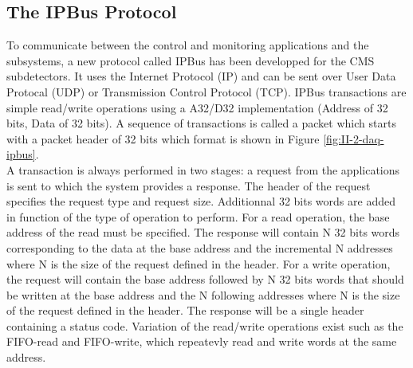    \subsection{The IPBus Protocol}

      To communicate between the control and monitoring applications and the subsystems, a new protocol called IPBus has been developped for the CMS subdetectors. It uses the Internet Protocol (IP) and can be sent over User Data Protocal (UDP) or Transmission Control Protocol (TCP). IPBus transactions are simple read/write operations using a A32/D32 implementation (Address of 32 bits, Data of 32 bits). A sequence of transactions is called a packet which starts with a packet header of 32 bits which format is shown in Figure \ref{fig:II-2-daq-ipbus}. \\

      A transaction is always performed in two stages: a request from the applications is sent to which the system provides a response. The header of the request specifies the request type and request size. Additionnal 32 bits words are added in function of the type of operation to perform. For a read operation, the base address of the read must be specified. The response will contain N 32 bits words corresponding to the data at the base address and the incremental N addresses where N is the size of the request defined in the header. For a write operation, the request will contain the base address followed by N 32 bits words that should be written at the base address and the N following addresses where N is the size of the request defined in the header. The response will be a single header containing a status code. Variation of the read/write operations exist such as the FIFO-read and FIFO-write, which repeatevly read and write words at the same address. \\


